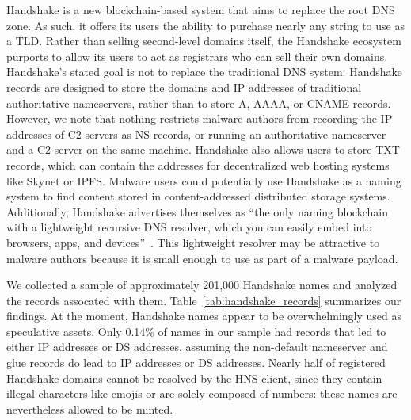 \documentclass[conference]{IEEEtran}
\begin{document}
Handshake is a new blockchain-based system that aims to 
replace the root DNS 
zone. As such, it offers its users the ability to purchase 
nearly any string to 
use as a TLD. Rather than selling second-level domains 
itself, the Handshake ecosystem purports to allow its users 
to act as registrars who can sell their own domains. 
Handshake's stated goal is not to replace the traditional DNS 
system: Handshake records are designed to store the domains 
and IP addresses of traditional authoritative nameservers, 
rather than to store A, AAAA, or CNAME records. However, we note that nothing 
restricts malware authors from recording the IP addresses of C2 servers as NS 
records, or running an authoritative nameserver and a C2 server on the same 
machine. Handshake also allows users to store TXT records, which can 
contain the addresses for decentralized web hosting systems 
like Skynet or IPFS. Malware users could potentially use 
Handshake as a naming system to find content stored in 
content-addressed distributed storage systems. Additionally, Handshake 
advertises themselves as ``the only naming blockchain with a lightweight 
recursive DNS resolver, which you can easily embed into 
browsers, apps, and devices''~\cite{namebase_access_handshake}. 
This lightweight resolver may be attractive to malware authors because it is 
small enough to use as part of a malware payload.

We collected a sample of approximately 201,000 Handshake names and analyzed the 
records assocated with them. Table~\ref{tab:handshake_records} 
summarizes our findings. At the moment, Handshake names appear to be 
overwhelmingly used as speculative assets. Only 0.14\% of names in our sample 
had records that led to either IP addresses or DS addresses, assuming the 
non-default nameserver and glue records do lead to IP addresses or DS 
addresses. Nearly half of registered Handshake domains cannot be resolved by 
the HNS client, since they contain illegal characters like emojis or are solely 
composed of numbers: these names are nevertheless allowed to be minted.

\end{document}
